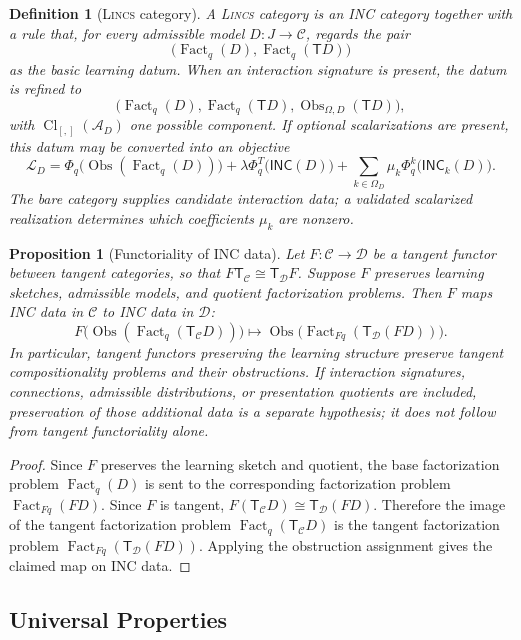 \documentclass{article}
\newtheorem{definition}{Definition}
\newtheorem{proposition}{Proposition}
\newcommand{\C}{\mathcal{C}}
\newcommand{\D}{\mathcal{D}}
\newcommand{\T}{\mathsf{T}}
\newcommand{\INC}{\mathsf{INC}}
\newcommand{\Loss}{\mathcal{L}}
\newcommand{\Fact}{\operatorname{Fact}}
\newcommand{\Cl}{\operatorname{Cl}}
\newcommand{\Obs}{\operatorname{Obs}}
\begin{document}
\begin{definition}[\textsc{Lincs}   category]
A \textsc{Lincs}   category is an INC category together with a rule that, for every admissible model \(D:J\to\C\), regards the pair
\[
\big(\Fact_q(D),\Fact_q(\T D)\big)
\]
as the basic learning datum. When an interaction signature is present, the datum is refined to
\[
\big(\Fact_q(D),\Fact_q(\T D),\Obs_{\Omega,D}(\T D)\big),
\]
with $\Cl_{[,]}(\mathcal A_D)$ one possible component. If optional scalarizations are present, this datum may be converted into an objective
\[
\Loss_D
  =
  \Phi_q\big(\Obs(\Fact_q(D))\big)
  +
  \lambda\Phi_q^T\big(\INC(D)\big)
  +
  \sum_{k\in\Omega_D}\mu_k\Phi_q^k\big(\INC_k(D)\big).
\]
The bare category supplies candidate interaction data; a validated scalarized
realization determines which coefficients $\mu_k$ are nonzero.
\end{definition}

\begin{proposition}[Functoriality of INC data]
Let \(F:\C\to\D\) be a tangent functor between tangent categories, so that \(F\T_{\C}\cong \T_{\D}F\). Suppose \(F\) preserves learning sketches, admissible models, and quotient factorization problems. Then \(F\) maps INC data in \(\C\) to INC data in \(\D\):
\[
F\big(\Obs(\Fact_q(\T_{\C}D))\big)
  \longmapsto
\Obs\big(\Fact_{Fq}(\T_{\D}(FD))\big).
\]
In particular, tangent functors preserving the learning structure preserve tangent compositionality problems and their obstructions.
If interaction signatures, connections, admissible distributions, or
presentation quotients are included, preservation of those additional data is
a separate hypothesis; it does not follow from tangent functoriality alone.
\end{proposition}

\begin{proof}
Since \(F\) preserves the learning sketch and quotient, the base factorization problem \(\Fact_q(D)\) is sent to the corresponding factorization problem \(\Fact_{Fq}(FD)\). Since \(F\) is tangent, \(F(\T_{\C}D)\cong \T_{\D}(FD)\). Therefore the image of the tangent factorization problem \(\Fact_q(\T_{\C}D)\) is the tangent factorization problem \(\Fact_{Fq}(\T_{\D}(FD))\). Applying the obstruction assignment gives the claimed map on INC data.
\end{proof}

\subsection{Universal Properties}
\end{document}
